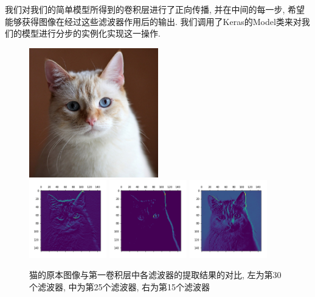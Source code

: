 \documentclass[lang=cn,11pt]{elegantpaper}
\begin{document}
我们对我们的简单模型所得到的卷积层进行了正向传播, 并在中间的每一步, 希望能够获得图像在经过这些滤波器作用后的输出. 我们调用了Keras的Model类来对我们的模型进行分步的实例化实现这一操作.

\begin{figure}[hbtp]
\centering
  \includegraphics[width=0.5\textwidth]{a.jpg} \\
  \includegraphics[width=0.30\textwidth]{30.png}
  \includegraphics[width=0.30\textwidth]{25}
  \includegraphics[width=0.30\textwidth]{15}
  \caption{猫的原本图像与第一卷积层中各滤波器的提取结果的对比, 左为第30个滤波器, 中为第25个滤波器, 右为第15个滤波器}
\end{figure}
\end{document}
